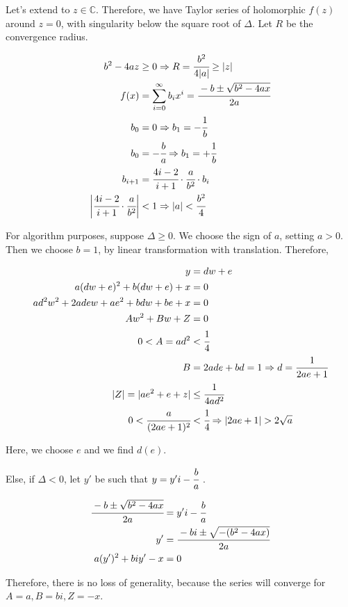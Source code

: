 \documentclass[12pt,a4paper]{article}
\begin{document}
Let's extend to $z \in \mathbb{C}$. Therefore, we have Taylor series of holomorphic $f(z)$ around $z = 0$, with singularity below the square root of $\Delta$. Let $R$ be the convergence radius.

\begin{align}
b^2 - 4az &\ge 0 \Rightarrow R = \cfrac{b^2}{4 |a|} \ge |z| \\
f(x) &= \sum_{i = 0}^\infty b_i x^i = \cfrac{-b \pm \sqrt{b^2 - 4ax}}{2a} \\
b_0 &= 0 \Rightarrow b_1 = - \cfrac{1}{b} \\
b_0 &= - \cfrac{b}{a} \Rightarrow b_1 = + \cfrac{1}{b} \\
b_{i + 1} &= \cfrac{4i - 2}{i + 1} \cdot \cfrac{a}{b^2}\cdot b_i \\
\bigg\vert \cfrac{4i - 2}{i + 1} \cdot \cfrac{a}{b^2} \bigg\vert &< 1 \Rightarrow |a| < \cfrac{b^2}{4}
\end{align}

For algorithm purposes, suppose $\Delta \ge 0$. We choose the sign of $a$, setting $a > 0$. Then we choose $b = 1$, by linear transformation with translation. Therefore,

\begin{align}
y &= dw + e \\
a(dw + e)^2 + b(dw + e) + x &= 0 \\
ad^2 w^2 + 2adew + a e^2 + bdw + be + x &= 0 \\
Aw^2 + Bw + Z &= 0 \\
0 < A = ad^2 &< \cfrac{1}{4} \\
B &= 2ade + bd = 1 \Rightarrow d = \cfrac{1}{2ae + 1} \\
|Z| = |ae^2 + e + z| &\le \cfrac{1}{4ad^2} \\
0 <  \cfrac{a}{(2ae + 1)^2} &< \cfrac{1}{4} \Rightarrow |2ae + 1| > 2\sqrt{a}
\end{align}

Here, we choose $e$ and we find $d(e)$.

Else, if $\Delta < 0$, let $y'$ be such that $y = y'i - \cfrac{b}{a}$ .

\begin{align}
\cfrac{-b \pm \sqrt{b^2 - 4ax}}{2a} &= y' i - \cfrac{b}{a} \\
y' &= \cfrac{-bi \pm \sqrt{-(b^2 - 4ax)}}{2a} \\
a(y')^2 + biy' - x &= 0
\end{align}

Therefore, there is no loss of generality, because the series will converge for $A = a, B = bi, Z = - x$.
\end{document}
